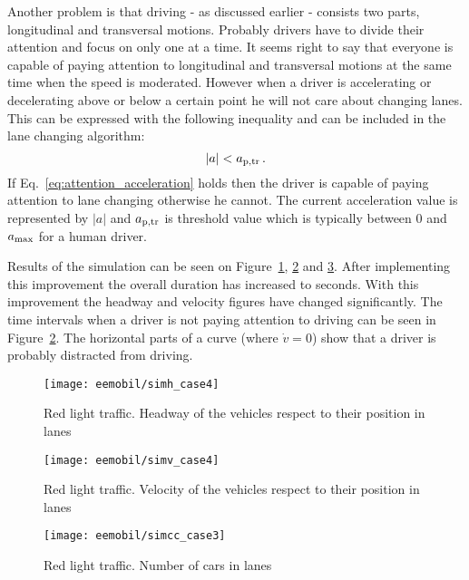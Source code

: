		 Another problem is that driving - as discussed earlier - consists two parts, longitudinal and transversal motions. Probably drivers have to divide their attention and focus on only one at a time. It seems right to say that everyone is capable of paying attention to longitudinal and transversal motions at the same time when the speed is moderated. However when a driver is accelerating or decelerating above or below a certain point he will not care about changing lanes. This can be expressed with the  following inequality and can be included in the lane changing algorithm:
		\begin{equation}
			|a|<a_{\rm p,tr}\,.
			\label{eq:attention_acceleration}
		\end{equation}
		If Eq.~\eqref{eq:attention_acceleration} holds then the driver is capable of paying attention to lane changing otherwise he cannot. The current acceleration value is represented by $|a|$ and $a_{\rm p,tr}$ is threshold value which is typically between 0 and $a_{\rm max}$ for a human driver.
		
		Results of the simulation can be seen on Figure~\ref{fig:red_light_situationh_impr3}, \ref{fig:red_light_situationv_impr3} and \ref{fig:red_light_situationcc_impr3}. After implementing this improvement the overall duration has increased to seconds. With this improvement the headway and velocity figures have changed significantly. The time intervals when a driver is not paying attention to driving can be seen in Figure~\ref{fig:red_light_situationv_impr3}. The horizontal parts of a curve (where $\dot{v}=0$) show that a driver is probably distracted from driving.
		\begin{figure}
			\centering
			\texttt{[image: eemobil/simh\_case4]}
			\caption{Red light traffic. Headway of the vehicles respect to their position in lanes}
			\label{fig:red_light_situationh_impr3}
		\end{figure}
		\begin{figure}
			\centering
			\texttt{[image: eemobil/simv\_case4]}
			\caption{Red light traffic. Velocity of the vehicles respect to their position in lanes}
			\label{fig:red_light_situationv_impr3}
		\end{figure}
		\begin{figure}
			\centering
			\texttt{[image: eemobil/simcc\_case3]}
			\caption{Red light traffic. Number of cars in lanes }
			\label{fig:red_light_situationcc_impr3}
		\end{figure}